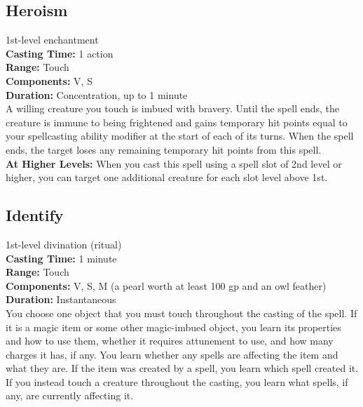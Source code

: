 \documentclass[11pt, A4paper, english]{article}
\begin{document}
		\subsection{Heroism}
1st-level enchantment \\
\textbf{Casting Time:} 1 action \\
\textbf{Range:} Touch \\
\textbf{Components:} V, S \\
\textbf{Duration:} Concentration, up to 1 minute \\
A willing creature you touch is imbued with bravery. Until the spell ends, the creature is immune to being frightened and gains temporary hit points equal to your spellcasting ability modifier at the start of each of its turns. When the spell ends, the target loses any remaining temporary hit points from this spell. \\
\textbf{At Higher Levels:} When you cast this spell using a spell slot of 2nd level or higher, you can target one additional creature for each slot level above 1st.

		\subsection{Identify}
1st-level divination (ritual) \\
\textbf{Casting Time:} 1 minute \\
\textbf{Range:} Touch \\
\textbf{Components:} V, S, M (a pearl worth at least  100 gp and an owl feather) \\
\textbf{Duration:} Instantaneous \\
You choose one object that you must touch throughout the casting of the spell. If it is a magic item or some other magic-imbued object, you learn its properties and how to use them, whether it requires attunement to use, and how many charges it has, if any. You learn whether any spells are affecting the item and what they are. If the item was created by a spell, you learn which spell created it. If you instead touch a creature throughout the casting, you learn what spells, if any, are currently affecting it.
\end{document}
